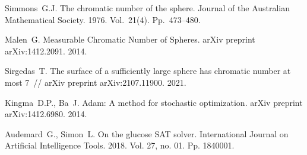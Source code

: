 \begin{thebibliography}{9} %

 Simmons~G.J.  The chromatic number of the sphere. Journal of the Australian Mathematical Society. 1976. Vol.~21(4). Pp.~473--480.

 Malen~G. Measurable Chromatic Number of Spheres. arXiv preprint arXiv:1412.2091. 2014.

 Sirgedas~T. The surface of a sufficiently large sphere has chromatic number at most 7~// arXiv preprint arXiv:2107.11900. 2021.

 Kingma~D.P., Ba~J. Adam: A method for stochastic optimization. arXiv preprint arXiv:1412.6980.  2014.

 Audemard~G., Simon~L. On the glucose SAT solver. International Journal on Artificial Intelligence Tools. 2018. Vol. 27, no. 01. Pp. 1840001.

\end{thebibliography}




%

